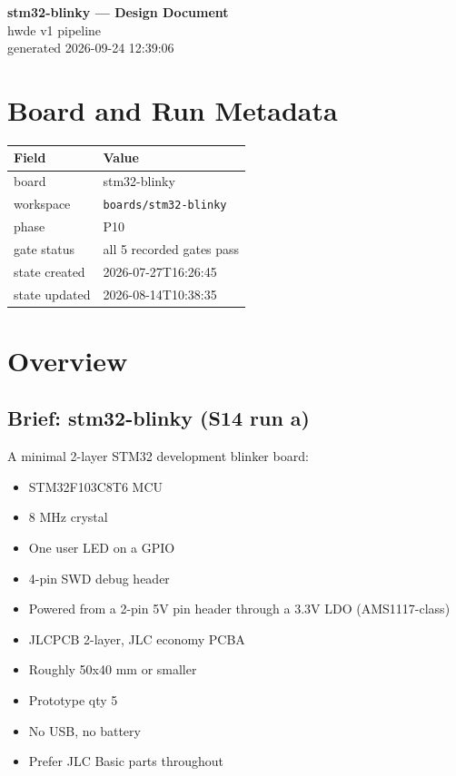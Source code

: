 \documentclass[11pt,a4paper]{article}
\begin{document}
\sloppy
\begin{center}
{\LARGE\bfseries stm32-blinky --- Design Document}\\[6pt]
{\large hwde v1 pipeline}\\[2pt]
generated 2026-09-24 12:39:06
\end{center}
\tableofcontents

\section{Board and Run Metadata}
{\small
\begin{longtable}{lp{11cm}}
\toprule
\textbf{Field} & \textbf{Value} \\
\midrule
\endhead
board & stm32-blinky \\
workspace & \texttt{boards/stm32-blinky} \\
phase & P10 \\
gate status & all 5 recorded gates pass \\
state created & 2026-07-27T16:26:45 \\
state updated & 2026-08-14T10:38:35 \\
\bottomrule
\end{longtable}
}
\section{Overview}
\subsection*{Brief: stm32-blinky (S14 run a)}
A minimal 2-layer STM32 development blinker board:

\begin{itemize}
\item STM32F103C8T6 MCU
\item 8 MHz crystal
\item One user LED on a GPIO
\item 4-pin SWD debug header
\item Powered from a 2-pin 5V pin header through a 3.3V LDO (AMS1117-class)
\item JLCPCB 2-layer, JLC economy PCBA
\item Roughly 50x40 mm or smaller
\item Prototype qty 5
\item No USB, no battery
\item Prefer JLC Basic parts throughout
\end{itemize}
\end{document}
